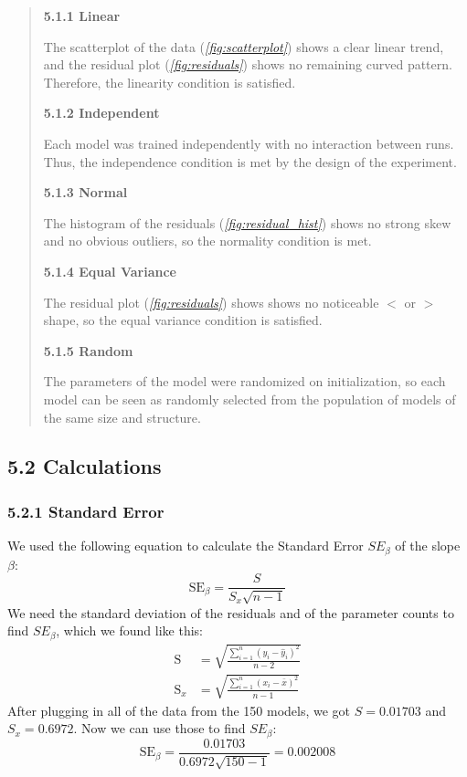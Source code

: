 \documentclass[12pt]{article}
\begin{document}
    \begin{quote}

    \textbf{5.1.1 Linear}

    The scatterplot of the data (\textit{\autoref{fig:scatterplot}}) shows a clear linear trend, and the residual plot (\textit{\autoref{fig:residuals}}) shows no remaining curved pattern.
    Therefore, the linearity condition is satisfied.

    \textbf{5.1.2 Independent}

    Each model was trained independently with no interaction between runs. Thus, the independence condition is met by the design of the experiment.

    \textbf{5.1.3 Normal}

    The histogram of the residuals (\textit{\autoref{fig:residual_hist}}) shows no strong skew and no obvious outliers,
    so the normality condition is met.

    \textbf{5.1.4 Equal Variance}

    The residual plot (\textit{\autoref{fig:residuals}}) shows shows no noticeable $<$ or $>$ shape, so the equal variance condition is satisfied.

    \textbf{5.1.5 Random}

    The parameters of the model were randomized on initialization, so each model can be seen as randomly selected from the population
    of models of the same size and structure.

    \end{quote}

    \subsection*{5.2 Calculations}

    \subsubsection*{5.2.1 Standard Error}

    We used the following equation to calculate the Standard Error $SE_\beta$ of the slope $\beta$:
    \[
        \mathrm{SE}_{\beta}
        =
        \frac{
            \displaystyle S
        }{
            \displaystyle S_x \sqrt{n - 1}
        }
    \]
    \noindent We need the standard deviation of the residuals and of the parameter counts to find $SE_\beta$, which we found like this:
    \begin{align*}
        \mathrm{S} &=
        \sqrt{
            \frac{
                \sum_{i=1}^n (y_i - \hat{y}_i)^2
            }{
                n - 2
            }
        } \\[1em]
        \mathrm{S}_x &=
        \sqrt{
            \frac{
                \sum_{i=1}^n (x_i - \bar{x})^2
            }{
                n - 1
            }
        }
    \end{align*}
    \noindent After plugging in all of the data from the 150 models, we got $S = 0.01703$ and $S_x = 0.6972$.
    Now we can use those to find $SE_\beta$:
    \[
        \mathrm{SE}_{\beta}
        =
        \frac{
            \displaystyle 0.01703
        }{
            \displaystyle 0.6972 \sqrt{150 - 1}
        }
        =
        0.002008
    \]
\end{document}
